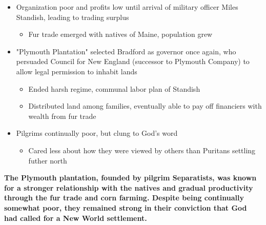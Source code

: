 \documentclass[a4paper]{article}
\begin{document}
{\begin{itemize}
\begin{itemize}
            \begin{itemize}
                \item Key helpers: Squanto and Samoset (Squanto spoke English due to previous capture by English, time in Europe)
                \item Marked allegiance to natives through invitation to first Thanksgiving in 1621
            \end{itemize}
            \item Good relationship did not last long: second smallpox epidemic wiped out most remaining
        \end{itemize}
        \item Organization poor and profits low until arrival of military officer Miles Standish, leading to trading surplus
        \begin{itemize}
            \item Fur trade emerged with natives of Maine, population grew
        \end{itemize}
        \item "Plymouth Plantation" selected Bradford as governor once again, who persuaded Council for New England (successor to Plymouth Company) to allow legal permission to inhabit lands
        \begin{itemize}
            \item Ended harsh regime, communal labor plan of Standish
            \item Distributed land among families, eventually able to pay off financiers with wealth from fur trade
        \end{itemize}
        \item Pilgrims continually poor, but clung to God's word
        \begin{itemize}
            \item Cared less about how they were viewed by others than Puritans settling futher north
        \end{itemize}
    \end{itemize}
    \textbf{The Plymouth plantation, founded by pilgrim Separatists, was known for a stronger relationship with the natives and gradual productivity through the fur trade and corn farming. Despite being continually somewhat poor, they remained strong in their conviction that God had called for a New World settlement.}}
    
\end{document}
